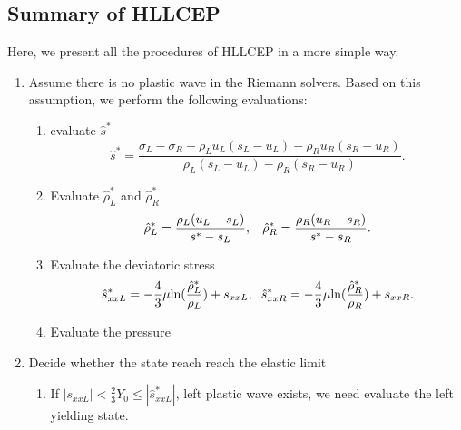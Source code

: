 \documentclass{article}
\numberwithin{equation}{section}
\numberwithin{table}{section}
\begin{document}
\subsection{Summary of HLLCEP}
Here, we present all the procedures of HLLCEP in  a more simple way.
\begin{enumerate}
  \item  Assume there is no plastic wave in the Riemann solvers. Based on this assumption, we perform the following evaluations:
  \begin{enumerate}
    \item evaluate  $\hat{s}^*$
    \begin{equation*}
       \hat{s}^* = \frac{\sigma_L-\sigma_R+\rho_L u_L(s_L-u_L)-\rho_R u_R(s_R-u_R)}{\rho_L(s_L-u_L)-\rho_R(s_R-u_R)}.
   \end{equation*}
    \item Evaluate  $\hat{\rho}_L^*$ and $\hat{\rho}_R^*$
    \begin{equation*}
       \hat{\rho}_L^* = \frac{\rho_L(u_L-s_L)}{s^*-s_L}, \hspace{0.3cm}  \hat{\rho}_R^* = \frac{\rho_R(u_R-s_R)}{s^*-s_R}.
    \end{equation*}
    \item Evaluate  the deviatoric stress
       \begin{equation*}
        \hat{s}_{xxL}^*=-\frac{4}{3}\mu\text{ln}(\frac{\hat{\rho}_L^*}{\rho_L})+s_{xxL},\hspace{0.2cm}  \hat{s}_{xxR}^*=-\frac{4}{3}\mu\text{ln}(\frac{\hat{\rho}_R^*}{\rho_R})+s_{xxR}.
      \end{equation*}
    \item Evaluate the pressure
  \end{enumerate}
  \item Decide whether the state reach reach the elastic limit
        \begin{enumerate}
          \item If $|s_{xxL}| < \frac{2}{3}Y_0 \le |\hat{s}_{xxL}^*| $, left plastic wave exists, we need evaluate the left yielding state.
          

\end{enumerate}
\end{enumerate}
\end{document}
